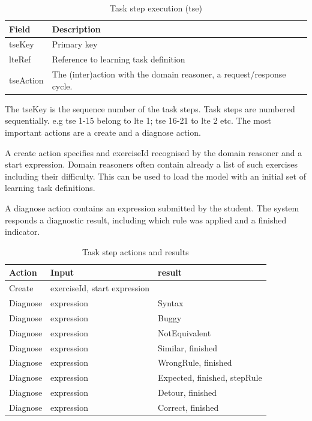 \begin{table}[H]
\begin{tabular}{| l | l | r |}
\hline
Field & Description\\
\hline
tseKey & Primary key \\
lteRef & Reference to learning task definition\\
tseAction & The (inter)action with the domain reasoner, a request/response cycle.\\
\hline
\end{tabular}
\caption{Task step execution (tse)}
\label{Task step execution}
\end{table}

The tseKey is the sequence number of the task steps. 
Task steps are numbered sequentially. e.g tse 1-15 belong to lte 1;  tse 16-21 to lte 2 etc.
 The most important actions are a create and a diagnose action.

A create action specifies and exerciseId recognised by the domain reasoner and a start expression.
Domain reasoners often contain already a list of such exercises including their difficulty.
This can be used to load the model with an initial set of learning task definitions.

A diagnose action contains an expression submitted by the student.
The system responds a diagnostic result, including which rule was applied and a finished indicator.



\begin{table}[H]
\begin{tabular}{| l | l | l |}
\hline
Action & Input & result\\
\hline
Create & exerciseId, start expression & \\
Diagnose & expression & Syntax\\
Diagnose & expression & Buggy\\
Diagnose & expression & NotEquivalent\\
Diagnose & expression & Similar, finished\\
Diagnose & expression & WrongRule, finished\\
Diagnose & expression & Expected, finished, stepRule\\
Diagnose & expression & Detour, finished\\
Diagnose & expression & Correct, finished\\
\hline
\end{tabular}
\caption{Task step actions and results}
\label{Task step actions}
\end{table}

